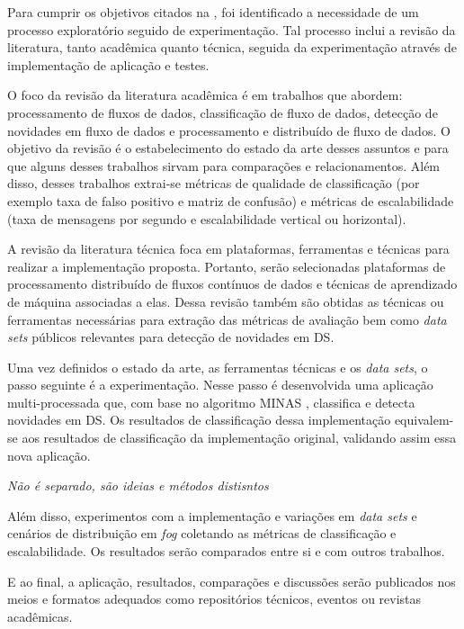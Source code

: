
Para cumprir os objetivos citados na , foi identificado a necessidade
de um processo exploratório seguido de experimentação. Tal processo inclui a
revisão da literatura, tanto acadêmica quanto técnica, seguida da experimentação
através de implementação de aplicação e testes.

O foco da revisão da literatura acadêmica é em trabalhos que abordem:
processamento de fluxos de dados, classificação de fluxo de dados, detecção de
novidades em fluxo de dados e processamento e distribuído de fluxo de dados.
O objetivo da revisão é o estabelecimento do estado da arte desses assuntos
e para que alguns desses trabalhos sirvam para comparações e relacionamentos.
Além disso, desses trabalhos extrai-se métricas de qualidade de classificação
(por exemplo taxa de falso positivo e matriz de confusão) e métricas de
escalabilidade (taxa de mensagens por segundo e escalabilidade vertical ou
horizontal).

A revisão da literatura técnica foca em plataformas, ferramentas e técnicas
para realizar a implementação proposta.
Portanto, serão selecionadas plataformas de processamento distribuído de fluxos
contínuos de dados e técnicas de aprendizado de máquina associadas a elas. Dessa revisão também são obtidas
as técnicas ou ferramentas necessárias
para extração das métricas de avaliação bem como \emph{data sets}
públicos relevantes para detecção de novidades em DS.

Uma vez definidos o estado da arte, as ferramentas técnicas e os
\emph{data sets}, o passo seguinte é a experimentação.
Nesse passo é desenvolvida uma aplicação multi-processada que, com base no
algoritmo MINAS \cite{Faria2016minas}, classifica e detecta novidades em DS.
Os resultados de classificação dessa implementação equivalem-se aos resultados 
de classificação da implementação original, validando assim essa nova
aplicação. 

\textit{Não é separado, são ideias e métodos distisntos}

Além disso, experimentos com a implementação e variações em \emph{data sets} e
cenários de distribuição em \emph{fog} coletando as métricas de classificação e escalabilidade.
Os resultados serão comparados entre si e com outros trabalhos.

E ao final, a aplicação, resultados, comparações e discussões serão publicados
nos meios e formatos adequados como repositórios técnicos, eventos ou revistas
acadêmicas.

